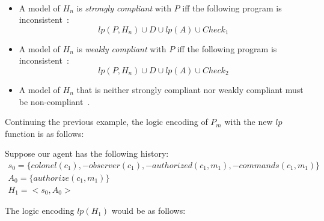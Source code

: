 \begin{definition}
    \label{def:authorization_event_compliance_history_knowledge}
    ~

    \begin{itemize}
        \item A model of $H_n$ is \textit{strongly compliant} with $P$ iff the following program is inconsistent~\citep{gelfond_authorization_2008}:
            \begin{equation}
                \label{eq:authorization_history_knowledge_strongly_compliant}
                lp(P, H_n) \cup D \cup lp(A) \cup Check_1
            \end{equation}
        \item A model of $H_n$ is \textit{weakly compliant} with $P$ iff the following program is inconsistent~\citep{gelfond_authorization_2008}:
            \begin{equation}
                \label{eq:authorization_history_knowledge_weakly_compliant}
                lp(P, H_n) \cup D \cup lp(A) \cup Check_2
            \end{equation}
        \item A model of $H_n$ that is neither strongly compliant nor weakly compliant must be non-compliant~\citep{gelfond_authorization_2008}.
    \end{itemize}
\end{definition}

Continuing the previous example, the logic encoding of $P_m$ with the new $lp$ function is as follows:


Suppose our agent has the following history\footnotemark:
\begin{gather}
    s_0 = \{ colonel(c_1), -observer(c_1), -authorized(c_1, m_1), -commands(c_1, m_1) \} \\
    A_0 = \{ authorize(c_1, m_1) \} \\
    H_1 = < s_0, A_0 >
\end{gather}


The logic encoding $lp(H_1)$ would be as follows\footnotemark:


